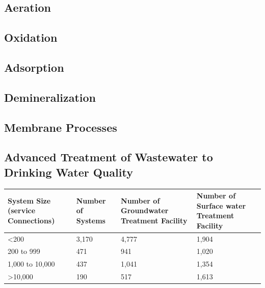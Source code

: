 \subsection{Aeration}
\subsection{Oxidation}
\subsection{Adsorption}
\subsection{Demineralization}
\subsection{Membrane Processes}
\subsection{Advanced Treatment of Wastewater to Drinking Water Quality}

\begin{table}[]
\begin{tabular}{|l|l|l|l|}
\hline
System   Size (service   Connections) & Number   of Systems & Number   of Groundwater   Treatment   Facility & Number   of Surface water   Treatment   Facility \\ \hline
\textless{}200                        & 3,170               & 4,777                                          & 1,904                                            \\ \hline
200 to   999                          & 471                 & 941                                            & 1,020                                            \\ \hline
1,000   to   10,000                   & 437                 & 1,041                                          & 1,354                                            \\ \hline
\textgreater{}10,000                  & 190                 & 517                                            & 1,613                                            \\ \hline
\end{tabular}
\end{table}


